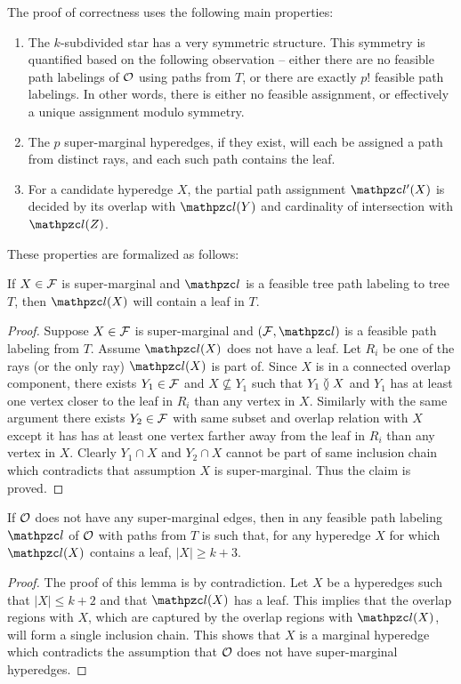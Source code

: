 \noindent
The proof of correctness uses the following main properties:
\begin{enumerate}
\item The $k$-subdivided star has a very symmetric structure.  This
  symmetry is quantified based on the following observation -- either
  there are no feasible path labelings of ${\cal O}$ using paths from $T$,
  or there are exactly $p!$ feasible path labelings.  In other words,
  there is either no feasible assignment, or effectively a unique
  assignment modulo symmetry.
\item The $p$ super-marginal hyperedges, if they exist, will each be
  assigned a path from distinct rays, and each such path contains the
  leaf.
\item For a candidate hyperedge $X$, the partial path assignment
  $\cl'(X)$ is decided by its overlap with $\cl(Y)$ and cardinality of
  intersection with $\cl(Z)$.
\end{enumerate}
These properties are formalized as follows:
\begin{lemma}
  \label{lem:sup-mar}
  If $X \in {\cal F}$ is super-marginal and $\cl$ is a feasible tree path
  labeling to tree $T$, then $\cl(X)$ will contain a leaf in $T$.
\end{lemma}
\begin{proof}\thesisspacing
  Suppose $X \in {\cal F}$ is super-marginal and $(\cF, \cl)$ is a feasible
  path labeling from $T$.  Assume $\cl(X)$ does not have a leaf.  Let
  $R_i$ be one of the rays (or the only ray) $\cl(X)$ is part of.
  Since $X$ is in a connected overlap component, there exists $Y_1 \in
  {\cal F}$ and $X \nsubseteq Y_1$ such that $Y_1 \between X$ and $Y_1$ has
  at least one vertex closer to the leaf in $R_i$ than any vertex in
  $X$. Similarly with the same argument there exists $Y_2 \in {\cal F}$
  with same subset and overlap relation with $X$ except it has has at
  least one vertex farther away from the leaf in $R_i$ than any vertex
  in $X$. Clearly $Y_1 \cap X$ and $Y_2 \cap X$ cannot be part of same
  inclusion chain which contradicts that assumption $X$ is
  super-marginal. Thus the claim is proved.
\end{proof}
\begin{lemma}
  If ${\cal O}$ does not have any super-marginal edges, then in any
  feasible path labeling $\cl$ of ${\cal O}$ with paths from $T$ is such
  that, for any hyperedge $X$ for which $\cl(X)$ contains a leaf, $|X|
  \geq k+3$.
\end{lemma}
\begin{proof}\thesisspacing
  The proof of this lemma is by contradiction.  Let $X$ be a
  hyperedges such that $|X| \leq k+2$ and that $\cl(X)$ has a leaf.
  This implies that the overlap regions with $X$, which are captured by
  the overlap regions with $\cl(X)$, will form a single inclusion
  chain. This shows that $X$ is a marginal hyperedge which
  contradicts the assumption that ${\cal O}$ does not have super-marginal
  hyperedges. 
\end{proof}
